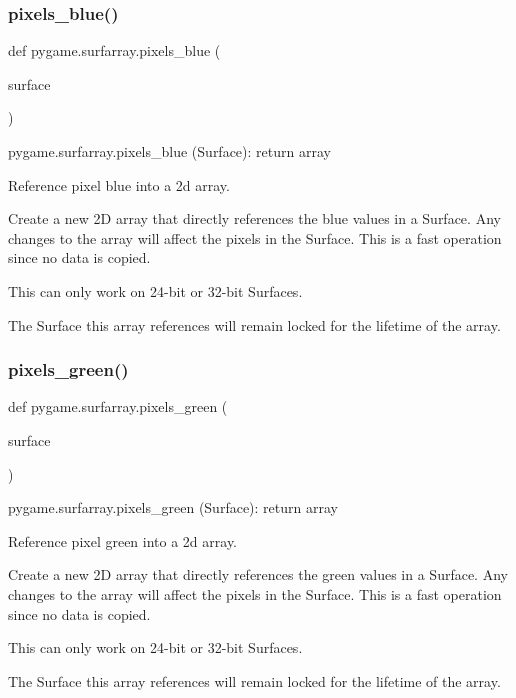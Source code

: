 \subsubsection{\texorpdfstring{pixels\+\_\+blue()}{pixels\_blue()}}
{\footnotesize\ttfamily def pygame.\+surfarray.\+pixels\+\_\+blue (\begin{DoxyParamCaption}\item[{}]{surface }\end{DoxyParamCaption})}

\begin{DoxyVerb}pygame.surfarray.pixels_blue (Surface): return array

Reference pixel blue into a 2d array.

Create a new 2D array that directly references the blue values
in a Surface. Any changes to the array will affect the pixels
in the Surface. This is a fast operation since no data is copied.

This can only work on 24-bit or 32-bit Surfaces.

The Surface this array references will remain locked for the
lifetime of the array.
\end{DoxyVerb}
 \mbox{\label{namespacepygame_1_1surfarray_a050d01135afee2f22c3cf0cf2b57007c}} 
\subsubsection{\texorpdfstring{pixels\+\_\+green()}{pixels\_green()}}
{\footnotesize\ttfamily def pygame.\+surfarray.\+pixels\+\_\+green (\begin{DoxyParamCaption}\item[{}]{surface }\end{DoxyParamCaption})}

\begin{DoxyVerb}pygame.surfarray.pixels_green (Surface): return array

Reference pixel green into a 2d array.

Create a new 2D array that directly references the green values
in a Surface. Any changes to the array will affect the pixels
in the Surface. This is a fast operation since no data is copied.

This can only work on 24-bit or 32-bit Surfaces.

The Surface this array references will remain locked for the
lifetime of the array.
\end{DoxyVerb}
 \mbox{\label{namespacepygame_1_1surfarray_ae7d481531ffdcf4f915a22161ee2d5a5}} 

